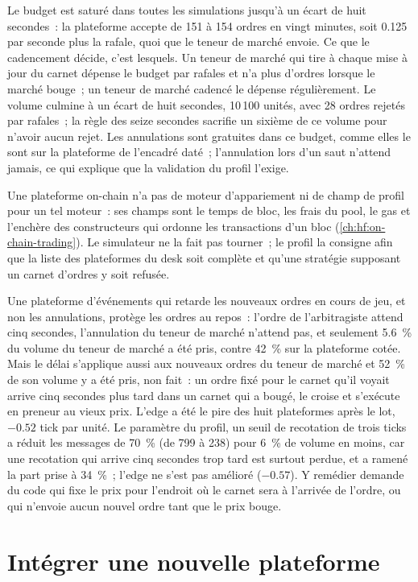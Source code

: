 Le budget est saturé dans toutes les simulations jusqu'à un écart de huit secondes~: la plateforme accepte de 151 à 154 ordres en vingt minutes, soit 0.125 par seconde plus la rafale,
quoi que le teneur de marché envoie. Ce que le cadencement décide, c'est lesquels. Un teneur de marché qui tire à chaque mise à jour du carnet dépense le budget par rafales et n'a plus
d'ordres lorsque le marché bouge~; un teneur de marché cadencé le dépense régulièrement. Le volume culmine à un écart de huit secondes, 10\,100 unités, avec 28 ordres rejetés par
rafales~; la règle des seize secondes sacrifie un sixième de ce volume pour n'avoir aucun rejet. Les annulations sont gratuites dans ce budget, comme elles le sont sur la
plateforme de l'encadré daté~; l'annulation lors d'un saut n'attend jamais, ce qui explique que la validation du profil l'exige.

Une plateforme on-chain n'a pas de moteur d'appariement ni de champ de profil pour un tel moteur~: ses champs sont le temps de bloc, les frais du pool, le gas et l'enchère des constructeurs
qui ordonne les transactions d'un bloc (\cref{ch:hf:on-chain-trading}). Le simulateur ne la fait pas tourner~; le profil la consigne afin que la
liste des plateformes du desk soit complète et qu'une stratégie supposant un carnet d'ordres y soit refusée.

Une plateforme d'événements qui retarde les nouveaux ordres en cours de jeu, et non les annulations, protège les ordres au repos~: l'ordre de l'arbitragiste attend cinq secondes, l'annulation du teneur de marché
n'attend pas, et seulement 5.6~\% du volume du teneur de marché a été pris, contre 42~\% sur la plateforme cotée. Mais le délai s'applique aussi aux nouveaux ordres du teneur de marché
et 52~\% de son volume y a été pris, non fait~: un ordre fixé pour le carnet qu'il voyait arrive cinq secondes plus tard dans un carnet qui a bougé,
le croise et s'exécute en preneur au vieux prix. L'edge a été le pire des huit plateformes après le lot, $-0.52$ tick par unité. Le paramètre du profil,
un seuil de recotation de trois ticks a réduit les messages de 70~\% (de 799 à 238) pour 6~\% de volume en moins, car une recotation qui arrive cinq secondes
trop tard est surtout perdue, et a ramené la part prise à 34~\%~; l'edge ne s'est pas amélioré ($-0.57$). Y remédier demande du code qui fixe le prix pour l'endroit où le carnet sera
à l'arrivée de l'ordre, ou qui n'envoie aucun nouvel ordre tant que le prix bouge.

\section{Intégrer une nouvelle plateforme}

